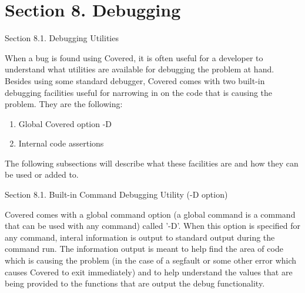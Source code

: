 \section{Section 8.  Debugging}\label{page_debugging}
\begin{Desc}
\item[Section 8.1. Debugging Utilities]\end{Desc}
\begin{Desc}
\item[]When a bug is found using Covered, it is often useful for a developer to understand what utilities are available for debugging the problem at hand. Besides using some standard debugger, Covered comes with two built-in debugging facilities useful for narrowing in on the code that is causing the problem. They are the following:\end{Desc}
\begin{Desc}
\item[]\begin{enumerate}
\item Global Covered option -D \item Internal code assertions \end{enumerate}
\end{Desc}
\begin{Desc}
\item[]The following subsections will describe what these facilities are and how they can be used or added to.\end{Desc}
\begin{Desc}
\item[Section 8.1. Built-in Command Debugging Utility (-D option)]\end{Desc}
\begin{Desc}
\item[]Covered comes with a global command option (a global command is a command that can be used with any command) called '-D'. When this option is specified for any command, interal information is output to standard output during the command run. The information output is meant to help find the area of code which is causing the problem (in the case of a segfault or some other error which causes Covered to exit immediately) and to help understand the values that are being provided to the functions that are output the debug functionality.\end{Desc}

